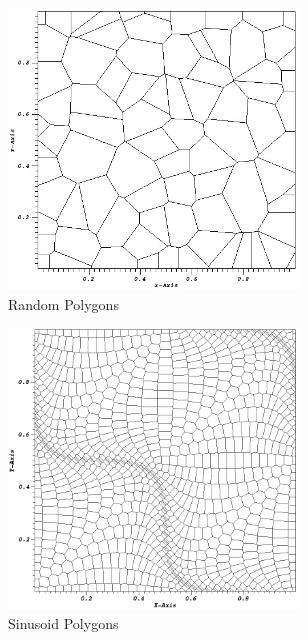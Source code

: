 \begin{figure}
\begin{subfigure}[b]{0.45\textwidth}
		\centering
		\includegraphics[width=0.85\textwidth]{figures/sec_DSA/SIP_poly_mesh.png}
		\caption{Random Polygons}
	\end{subfigure}
	\vfill
	\begin{subfigure}[b]{0.45\textwidth}
		\centering
		\includegraphics[width=0.85\textwidth]{figures/sec_DSA/SIP_sine_poly_mesh.png}
		\caption{Sinusoid Polygons}
	\end{subfigure}
	\hfill
	\begin{subfigure}[b]{0.45\textwidth}
		\centering

\end{subfigure}
\end{figure}
